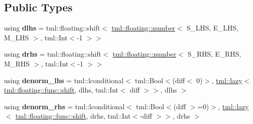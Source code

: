 \subsection*{Public Types}
\begin{DoxyCompactItemize}
\item 
\hypertarget{structtml_1_1add_3_01tml_1_1floating_1_1number_3_01S__LHS_00_01E__LHS_00_01M__LHS_01_4_00_01tml_bcc37312d9cac834cee3a6666bbc4d1c_a6ef805f3db7190cc8f4db93b6b656f97}{using {\bfseries dlhs} = tml\+::floating\+::shift$<$ \hyperlink{structtml_1_1floating_1_1number}{tml\+::floating\+::number}$<$ S\+\_\+\+L\+H\+S, E\+\_\+\+L\+H\+S, M\+\_\+\+L\+H\+S $>$, tml\+::\+Int$<$-\/1 $>$$>$}\label{structtml_1_1add_3_01tml_1_1floating_1_1number_3_01S__LHS_00_01E__LHS_00_01M__LHS_01_4_00_01tml_bcc37312d9cac834cee3a6666bbc4d1c_a6ef805f3db7190cc8f4db93b6b656f97}

\item 
\hypertarget{structtml_1_1add_3_01tml_1_1floating_1_1number_3_01S__LHS_00_01E__LHS_00_01M__LHS_01_4_00_01tml_bcc37312d9cac834cee3a6666bbc4d1c_a4da0ab59b2d9b49aec796a076f29733b}{using {\bfseries drhs} = tml\+::floating\+::shift$<$ \hyperlink{structtml_1_1floating_1_1number}{tml\+::floating\+::number}$<$ S\+\_\+\+R\+H\+S, E\+\_\+\+R\+H\+S, M\+\_\+\+R\+H\+S $>$, tml\+::\+Int$<$-\/1 $>$$>$}\label{structtml_1_1add_3_01tml_1_1floating_1_1number_3_01S__LHS_00_01E__LHS_00_01M__LHS_01_4_00_01tml_bcc37312d9cac834cee3a6666bbc4d1c_a4da0ab59b2d9b49aec796a076f29733b}

\item 
\hypertarget{structtml_1_1add_3_01tml_1_1floating_1_1number_3_01S__LHS_00_01E__LHS_00_01M__LHS_01_4_00_01tml_bcc37312d9cac834cee3a6666bbc4d1c_af7919ae449608836364cb45053071488}{using {\bfseries denorm\+\_\+lhs} = tml\+::lconditional$<$ tml\+::\+Bool$<$(diff$<$ 0)$>$, \hyperlink{structtml_1_1lazy}{tml\+::lazy}$<$ \hyperlink{structtml_1_1floating_1_1impl_1_1shift}{tml\+::floating\+::func\+::shift}, dlhs, tml\+::\+Int$<$ diff $>$$>$, dlhs $>$}\label{structtml_1_1add_3_01tml_1_1floating_1_1number_3_01S__LHS_00_01E__LHS_00_01M__LHS_01_4_00_01tml_bcc37312d9cac834cee3a6666bbc4d1c_af7919ae449608836364cb45053071488}

\item 
\hypertarget{structtml_1_1add_3_01tml_1_1floating_1_1number_3_01S__LHS_00_01E__LHS_00_01M__LHS_01_4_00_01tml_bcc37312d9cac834cee3a6666bbc4d1c_a432f0efd40081f16e7dbf3689a96a458}{using {\bfseries denorm\+\_\+rhs} = tml\+::lconditional$<$ tml\+::\+Bool$<$(diff $>$=0)$>$, \hyperlink{structtml_1_1lazy}{tml\+::lazy}$<$ \hyperlink{structtml_1_1floating_1_1impl_1_1shift}{tml\+::floating\+::func\+::shift}, drhs, tml\+::\+Int$<$-\/diff $>$$>$, drhs $>$}\label{structtml_1_1add_3_01tml_1_1floating_1_1number_3_01S__LHS_00_01E__LHS_00_01M__LHS_01_4_00_01tml_bcc37312d9cac834cee3a6666bbc4d1c_a432f0efd40081f16e7dbf3689a96a458}


\end{DoxyCompactItemize}
